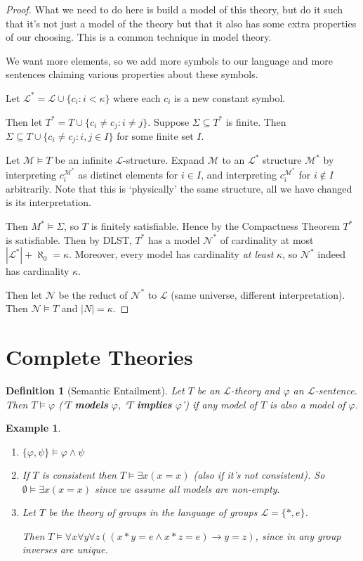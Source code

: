 \documentclass[]{article}
\theoremstyle{custhm}
\theoremstyle{cusdef}
\newtheorem{defin}[theorem]{Definition}
\theoremstyle{custhm}
\theoremstyle{custhm}
\theoremstyle{custhm}
\theoremstyle{ex}
\newtheorem{ex}[theorem]{Example}
\theoremstyle{custhm}
\theoremstyle{cusdef}
\theoremstyle{remark}
\theoremstyle{remark}
\theoremstyle{numremark}
\newcommand{\ra}{\rightarrow}
\newcommand{\undf}[1]{\textit{\textbf{#1}}}
\renewcommand{\L}{\mathcal{L}}
\renewcommand{\it}[1]{\textit{#1}}
\newcommand{\M}{\mathcal{M}}
\renewcommand{\phi}{\varphi}
\renewcommand{\subset}{\subseteq}
\begin{document}
\begin{proof}
What we need to do here is build a model of this theory, but do it such that it's not just a model of the theory but that it also has some extra properties of our choosing. This is a common technique in model theory.

We want more elements, so we add more symbols to our language and more sentences claiming various properties about these symbols.

Let $\L^\ast = \L \cup \{c_i : i < \kappa\}$ where each $c_i$ is a new constant symbol.

Then let $T^\ast = T\cup \{c_i\ne c_j: i\ne j\}$. Suppose $\Sigma \subset T^\ast$ is finite. Then $\Sigma \subset T\cup\{c_i\ne c_j:i,j\in I\}$ for some finite set $I$.

Let $\M\models T$ be an infinite $\L$-structure. Expand $\M$ to an $\L^{\ast}$ structure $\M^\ast$ by interpreting $c_i^{\M^\ast}$ as distinct elements for $i\in I$, and interpreting $c_i^{\M^\ast}$ for $i\not\in I$ arbitrarily. Note that this is `physically' the same structure, all we have changed is its interpretation.

Then $M^{\ast}\models\Sigma$, so $T$ is finitely satisfiable. Hence by the Compactness Theorem $T^\ast$ is satisfiable. Then by DLST, $T^\ast$ has a model $\mathcal{N}^\ast$ of cardinality at most $|\L^\ast|+\aleph_0 = \kappa$. Moreover, every model has cardinality \it{at least} $\kappa$, so $\mathcal{N}^\ast$ indeed has cardinality $\kappa$.

Then let $\mathcal{N}$ be the reduct of $\mathcal{N}^\ast$ to $\L$ (same universe, different interpretation). Then $\mathcal{N}\models T$ and $|N| = \kappa$.
\end{proof}

\section*{Complete Theories}

\begin{defin}[Semantic Entailment]
Let $T$ be an $\L$-theory and $\phi$ an $\L$-sentence. Then $T\models \phi$ (`$T$ \undf{models} $\phi$, `$T$ \undf{implies} $\phi$') if any model of $T$ is also a model of $\phi$.
\end{defin}

\begin{ex}\ 
\begin{enumerate}[label=\arabic*)]
\item $\{\phi,\psi\}\models \phi\land\psi$
\item If $T$ is consistent then $T\models \exists x(x=x)$ (also if it's not consistent). So $\emptyset \models \exists x(x=x)$ since we assume all models are non-empty.
\item Let $T$ be the theory of groups in the language of groups $\L = \{\ast,e\}$.

Then $T\models \forall x\forall y\forall z\left((x\ast y = e\land x\ast z = e)\ra y=z\right)$, since in any group inverses are unique.
\end{enumerate}
\end{ex}
\end{document}
